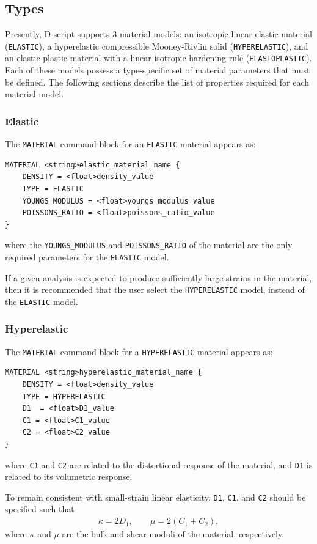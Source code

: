 \documentclass[11pt]{article} %
\begin{document}
\subsection{Types} Presently, D-script supports 3 material models: an isotropic linear elastic material (\texttt{ELASTIC}), a hyperelastic compressible Mooney-Rivlin solid (\texttt{HYPERELASTIC}), and an elastic-plastic material with a linear isotropic hardening rule (\texttt{ELASTOPLASTIC}). Each of these models possess a type-specific set of material parameters that must be defined. The following sections describe the list of properties required for each material model.

\subsubsection{Elastic}

The \texttt{MATERIAL} command block for an \texttt{ELASTIC} material appears as:
\begin{lstlisting}
MATERIAL <string>elastic_material_name {
	DENSITY = <float>density_value
	TYPE = ELASTIC
	YOUNGS_MODULUS = <float>youngs_modulus_value
	POISSONS_RATIO = <float>poissons_ratio_value
}
\end{lstlisting}
where the \texttt{YOUNGS\_MODULUS} and \texttt{POISSONS\_RATIO} of the material are the only required parameters for the \texttt{ELASTIC} model.

If a given analysis is expected to produce sufficiently large strains in the material, then it is recommended that the user select the \texttt{HYPERELASTIC} model, instead of the \texttt{ELASTIC} model.

\subsubsection{Hyperelastic}

The \texttt{MATERIAL} command block for a \texttt{HYPERELASTIC} material appears as:
\begin{lstlisting}
MATERIAL <string>hyperelastic_material_name {
	DENSITY = <float>density_value
	TYPE = HYPERELASTIC
	D1  = <float>D1_value
	C1 = <float>C1_value
	C2 = <float>C2_value
}
\end{lstlisting}
where \texttt{C1} and \texttt{C2} are related to the distortional response of the material, and \texttt{D1} is related to its volumetric response.

To remain consistent with small-strain linear elasticity, \texttt{D1}, \texttt{C1}, and \texttt{C2} should be specified such that
\begin{eqnarray}
	\kappa = 2 D_1 , \qquad \mu = 2 (C_{1} + C_{2}), \nonumber
\end{eqnarray}
where $\kappa$ and $\mu$ are the bulk and shear moduli of the material, respectively.
\end{document}
